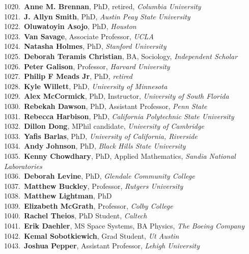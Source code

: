 1020.~{\bf Anne M. Brennan}, PhD, retired, {\sl Columbia University} \\
1021.~{\bf J. Allyn Smith}, PhD, {\sl Austin Peay State University} \\
1022.~{\bf Oluwatoyin Asojo}, PhD, {\sl Houston} \\
1023.~{\bf Van Savage}, Associate Professor, {\sl UCLA} \\
1024.~{\bf Natasha Holmes}, PhD, {\sl Stanford University} \\
1025.~{\bf Deborah Teramis Christian}, BA, Sociology, {\sl Independent Scholar} \\
1026.~{\bf Peter Galison}, Professor, {\sl Harvard University } \\
1027.~{\bf Philip F Meads Jr}, PhD, {\sl retired} \\
1028.~{\bf Kyle Willett}, PhD, {\sl University of Minnesota} \\
1029.~{\bf Alex McCormick}, PhD, Instructor, {\sl University of South Florida} \\
1030.~{\bf Rebekah Dawson}, PhD, Assistant Professor, {\sl Penn State} \\
1031.~{\bf Rebecca Harbison}, PhD, {\sl California Polytechnic State University} \\
1032.~{\bf Dillon Dong}, MPhil candidate, {\sl University of Cambridge} \\
1033.~{\bf Yafis Barlas}, PhD, {\sl University of California, Riverside} \\
1034.~{\bf Andy Johnson}, PhD, {\sl Black Hills State University} \\
1035.~{\bf Kenny Chowdhary}, PhD, Applied Mathematics, {\sl Sandia National Laboratories } \\
1036.~{\bf Deborah Levine}, PhD, {\sl Glendale Community College} \\
1037.~{\bf Matthew Buckley}, Professor, {\sl Rutgers University} \\
1038.~{\bf Matthew Lightman}, PhD \\
1039.~{\bf Elizabeth McGrath}, Professor, {\sl Colby College} \\
1040.~{\bf Rachel Theios}, PhD Student, {\sl Caltech} \\
1041.~{\bf Erik Daehler}, MS Space Systems, BA Physics, {\sl The Boeing Company} \\
1042.~{\bf Kemal Sobotkiewich}, Grad Student, {\sl Ut Austin} \\
1043.~{\bf Joshua Pepper}, Assistant Professor, {\sl Lehigh University} \\
